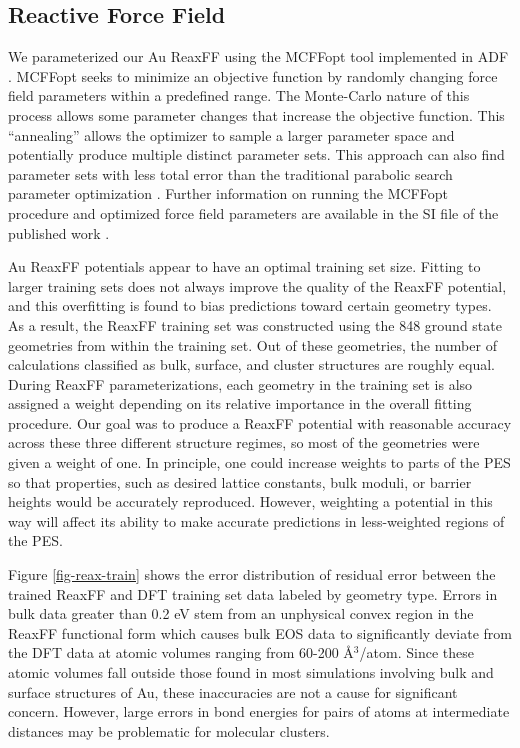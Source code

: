 \documentclass[12pt]{cmuthesis}
\begin{document}
\subsection{Reactive Force Field}
\label{sec:org5f0a1a3}
We parameterized our Au ReaxFF using the MCFFopt tool implemented in ADF \cite{velde-2001-chemis-adf,iype-2013-param-monte}. MCFFopt seeks to minimize an objective function by randomly changing force field parameters within a predefined range. The Monte-Carlo nature of this process allows some parameter changes that increase the objective function. This ``annealing'' allows the optimizer to sample a larger parameter space and potentially produce multiple distinct parameter sets. This approach can also find parameter sets with less total error than the traditional parabolic search parameter optimization \cite{iype-2013-param-monte}. Further information on running the MCFFopt procedure and optimized force field parameters are available in the SI file of the published work \cite{boes-2016-neural-networ}.

Au ReaxFF potentials appear to have an optimal training set size. Fitting to larger training sets does not always improve the quality of the ReaxFF potential, and this overfitting is found to bias predictions toward certain geometry types. As a result, the ReaxFF training set was constructed using the 848 ground state geometries from within the training set. Out of these geometries, the number of calculations classified as bulk, surface, and cluster structures are roughly equal. During ReaxFF parameterizations, each geometry in the training set is also assigned a weight depending on its relative importance in the overall fitting procedure. Our goal was to produce a ReaxFF potential with reasonable accuracy across these three different structure regimes, so most of the geometries were given a weight of one. In principle, one could increase weights to parts of the PES so that properties, such as desired lattice constants, bulk moduli, or barrier heights would be accurately reproduced. However, weighting a potential in this way will affect its ability to make accurate predictions in less-weighted regions of the PES.

Figure \ref{fig-reax-train} shows the error distribution of residual error between the trained ReaxFF and DFT training set data labeled by geometry type. Errors in bulk data greater than 0.2 eV stem from an unphysical convex region in the ReaxFF functional form which causes bulk EOS data to significantly deviate from the DFT data at atomic volumes ranging from 60-200 \AA{}\(^{\text{3}}\)/atom. Since these atomic volumes fall outside those found in most simulations involving bulk and surface structures of Au, these inaccuracies are not a cause for significant concern. However, large errors in bond energies for pairs of atoms at intermediate distances may be problematic for molecular clusters.
\end{document}
